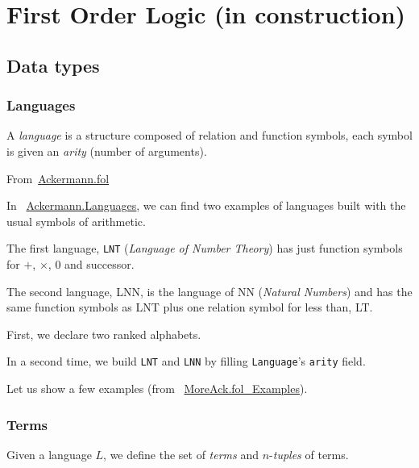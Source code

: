 \chapter{First Order Logic (in construction)}
\label{chap:fol}

\section{Data types}

\subsection{Languages}

A \emph{language} is a structure composed of relation and function symbols, each symbol is given an \emph{arity} (number of arguments).

From~\href{../theories/html/hydras.Ackermann.fol.html}{Ackermann.fol}

In ~\href{../theories/html/hydras.Ackermann.Languages.html}{Ackermann.Languages}, we can find two examples of languages built with the usual symbols of arithmetic.

The first language, \texttt{LNT} (\emph{Language of Number Theory}) has just function symbols for $+$, $\times$, $0$ and successor.




The second language, LNN, is the language of NN (\emph{Natural Numbers}) and has
the same function symbols as LNT plus one relation symbol for less than, LT.

First, we declare two ranked alphabets. 

In a second time, we build \texttt{LNT} and \texttt{LNN} by filling \texttt{Language}'s \texttt{arity} field.



Let us show a few examples (from ~\href{../theories/html/hydras.MoreAck.fol_Examples.html}{MoreAck.fol\_Examples}).



\subsection{Terms}

Given a language $L$, we define the set of \emph{terms} and
$n$-\emph{tuples} of terms.



